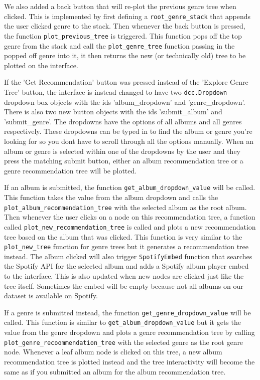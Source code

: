 \documentclass[fontsize=11pt]{article}
\begin{document}
We also added a back button that will re-plot the previous genre tree when clicked. This is implemented by first defining a \texttt{root\_genre\_stack} that appends the user clicked genre to the stack. Then whenever the back button is pressed, the function \texttt{plot\_previous\_tree} is triggered. This function pops off the top genre from the stack and call the \texttt{plot\_genre\_tree} function passing in the popped off genre into it, it then returns the new (or technically old) tree to be plotted on the interface. \newline

If the 'Get Recommendation' button was pressed instead of the 'Explore Genre Tree' button, the interface is instead changed to have two \texttt{dcc.Dropdown} dropdown box objects with the ids 'album\_dropdown' and 'genre\_dropdown'. There is also two new button objects with the ids 'submit\_album' and 'submit\_genre'. The dropdowns have the options of all albums and all genres respectively. These dropdowns can be typed in to find the album or genre you're looking for so you dont have to scroll through all the options manually. When an album or genre is selected within one of the dropdowns by the user and they press the matching submit button, either an album recommendation tree or a genre recommendation tree will be plotted. \newline

If an album is submitted, the function \texttt{get\_album\_dropdown\_value} will be called. This function takes the value from the album dropdown and calls the \texttt{plot\_album\_recommendation\_tree} with the selected album as the root album. Then whenever the user clicks on a node on this recommendation tree, a function called \texttt{plot\_new\_recommendation\_tree} is called and plots a new recommendation tree based on the album that was clicked. This function is very similar to the \texttt{plot\_new\_tree} function for genre trees but it generates a recommendation tree instead. The album clicked will also trigger \texttt{SpotifyEmbed} function that searches the Spotify API for the selected album and adds a Spotify album player embed to the interface. This is also updated when new nodes are clicked just like the tree itself. Sometimes the embed will be empty because not all albums on our dataset is available on Spotify. \newline

If a genre is submitted instead, the function \texttt{get\_genre\_dropdown\_value} will be called. This function is similar to \texttt{get\_album\_dropdown\_value} but it gets the value from the genre dropdown and plots a genre recommendation tree by calling \texttt{plot\_genre\_recoommendation\_tree} with the selected genre as the root genre node. Whenever a leaf album node is clicked on this tree, a new album recommendation tree is plotted instead and the tree interactivity will become the same as if you submitted an album for the album recommendation tree.
\end{document}
